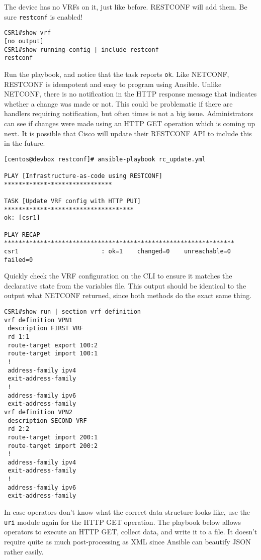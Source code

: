 The device has no VRFs on it, just like before. RESTCONF will add them.
Be sure \verb|restconf| is enabled!

\begin{verbatim}
CSR1#show vrf
[no output]
CSR1#show running-config | include restconf
restconf
\end{verbatim}

Run the playbook, and notice that the task reports \verb|ok|. Like NETCONF,
RESTCONF is idempotent and easy to program using Ansible. Unlike NETCONF,
there is no notification in the HTTP response message that indicates whether
a change was made or not. This could be problematic if there are handlers
requiring notification, but often times is not a big issue. Administrators can
see if changes were made using an HTTP GET operation which is coming up next.
It is possible that Cisco will update their RESTCONF API to include this
in the future.

\begin{verbatim}
[centos@devbox restconf]# ansible-playbook rc_update.yml

PLAY [Infrastructure-as-code using RESTCONF] ******************************

TASK [Update VRF config with HTTP PUT] ************************************
ok: [csr1]

PLAY RECAP ****************************************************************
csr1                       : ok=1    changed=0    unreachable=0    failed=0
\end{verbatim}

Quickly check the VRF configuration on the CLI to ensure it matches
the declarative state from the variables file. This output should be
identical to the output what NETCONF returned, since both methods
do the exact same thing.

\begin{verbatim}
CSR1#show run | section vrf definition
vrf definition VPN1
 description FIRST VRF
 rd 1:1
 route-target export 100:2
 route-target import 100:1
 !
 address-family ipv4
 exit-address-family
 !
 address-family ipv6
 exit-address-family
vrf definition VPN2
 description SECOND VRF
 rd 2:2
 route-target import 200:1
 route-target import 200:2
 !
 address-family ipv4
 exit-address-family
 !
 address-family ipv6
 exit-address-family
\end{verbatim}

In case operators don't know what the correct data structure looks like,
use the \verb|uri| module again for the HTTP GET operation. The playbook
below allows operators to execute an HTTP GET, collect data, and write it
to a file. It doesn't require quite as much post-processing as XML since
Ansible can beautify JSON rather easily.

